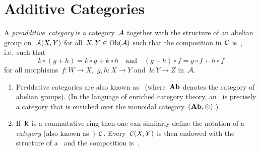 \section{Additive Categories}


\begin{definition}
  A \emph{preadditive~category} is a category~$\mathcal{A}$ together with the structure of an abelian group on~$\mathcal{A}(X,Y)$ for all~$X, Y \in \operatorname{Ob}(\mathcal{A})$ such that the composition in~$\mathcal{C}$ is~{\Zbilin}, i.e.\ such that
  \[
    k \circ (g + h) = k \circ g + k \circ h
    \quad\text{and}\quad
    (g + h) \circ f = g \circ f + h \circ f
  \]
  for all morphisms~$f \colon W \to X$,~$g, h \colon X \to Y$ and~$k \colon Y \to Z$ in~$\mathcal{A}$.
\end{definition}


\begin{remark}
  \leavevmode
  \begin{enumerate}
    \item
      Preddative categories are also known as~\emph{} (where~$\mathbf{Ab}$ denotes the category of abelian groups).
      (In the language of enriched category theory, an~ is precisely a category that is enriched over the monoidal category~$(\mathbf{Ab},{\otimes})$.)
    \item
      If~$\kf$ is a commutative ring then one can similarly define the notation of a \emph{{\preklin} category} (also known as~\emph{})~$\mathcal{C}$.
      Every~$\mathcal{C}(X,Y)$ is then endowed with the structure of a~{\module{$\kf$}} and the composition is~{\kbilin}.
  \end{enumerate}
\end{remark}


